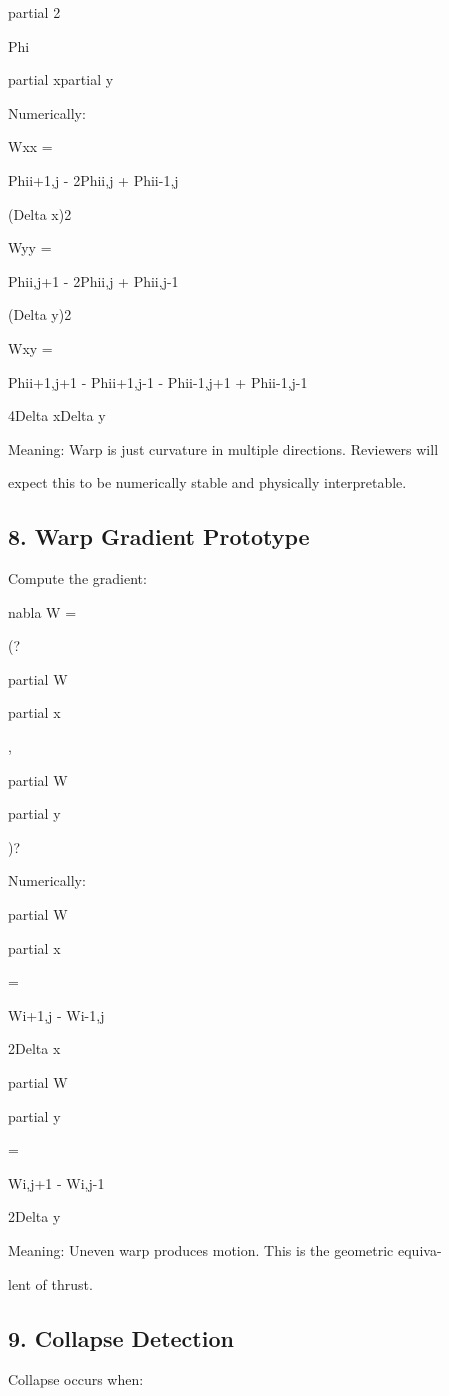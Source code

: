 \documentclass[10pt]{article}
\begin{document}
partial 2

Phi

partial xpartial y

Numerically:

Wxx =

Phii+1,j - 2Phii,j + Phii-1,j

(Delta x)2

Wyy =

Phii,j+1 - 2Phii,j + Phii,j-1

(Delta y)2

Wxy =

Phii+1,j+1 - Phii+1,j-1 - Phii-1,j+1 + Phii-1,j-1

4Delta xDelta y

Meaning: Warp is just curvature in multiple directions. Reviewers will

expect this to be numerically stable and physically interpretable.

\subsection*{8. Warp Gradient Prototype}
Compute the gradient:

nabla W =

(?

partial W

partial x

,

partial W

partial y

)?

Numerically:

partial W

partial x

=

Wi+1,j - Wi-1,j

2Delta x

partial W

partial y

=

Wi,j+1 - Wi,j-1

2Delta y

Meaning: Uneven warp produces motion. This is the geometric equiva-

lent of thrust.


\subsection*{9. Collapse Detection}
Collapse occurs when:
\end{document}
